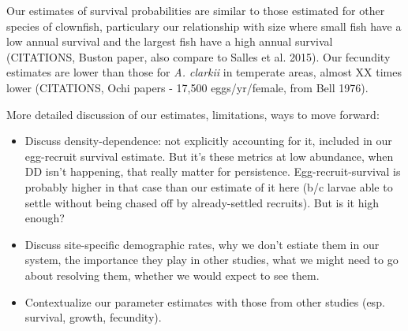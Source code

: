 \documentclass[12pt, oneside]{article}   	%
\begin{document}
Our estimates of survival probabilities are similar to those estimated for other species of clownfish, particulary our relationship with size where small fish have a low annual survival and the largest fish have a high annual survival (CITATIONS, Buston paper, also compare to Salles et al. 2015). Our fecundity estimates are lower than those for \textit{A. clarkii} in temperate areas, almost XX times lower (CITATIONS, Ochi papers - 17,500 eggs/yr/female, from Bell 1976).


More detailed discussion of our estimates, limitations, ways to move forward:
\begin{itemize}
	\item Discuss density-dependence: not explicitly accounting for it, included in our egg-recruit survival estimate. But it's these metrics at low abundance, when DD isn't happening, that really matter for persistence. Egg-recruit-survival is probably higher in that case than our estimate of it here (b/c larvae able to settle without being chased off by already-settled recruits). But is it high enough?
	\item Discuss site-specific demographic rates, why we don't estiate them in our system, the importance they play in other studies, what we might need to go about resolving them, whether we would expect to see them.
	\item Contextualize our parameter estimates with those from other studies (esp. survival, growth, fecundity).

\end{itemize}
\end{document}
